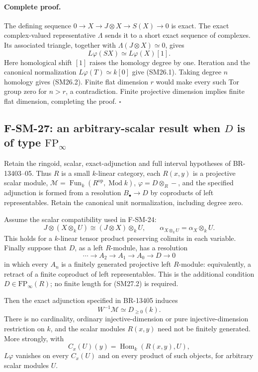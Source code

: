 \documentclass[11pt,a4paper]{article}
\theoremstyle{definition}\newtheorem{definition}[theorem]{Definition}
\theoremstyle{remark}\newtheorem{remark}[theorem]{Remark}
\begin{document}
\paragraph{Complete proof.}
The defining sequence
\(0\to X\to J\otimes X\to S(X)\to0\) is exact.
The exact complex-valued representative \(\Lambda\) sends it to a short
exact sequence of complexes.  Its associated triangle, together with
\(\Lambda(J\otimes X)\simeq0\), gives
\[
 L\varphi(SX)\simeq L\varphi(X)[1].
\]
Here homological shift \([1]\) raises the homology degree by one.
Iteration and the canonical normalization \(L\varphi(T)\simeq k[0]\)
give (SM26.1).  Taking degree \(n\) homology gives (SM26.2).
Finite flat dimension \(r\) would make every such Tor group zero for
\(n>r\), a contradiction.  Finite projective dimension implies finite
flat dimension, completing the proof. \(\square\)

\subsection{F-SM-27: an arbitrary-scalar result when \(D\) is of type \(\mathrm{FP}_\infty\)}
Retain the ringoid, scalar, exact-adjunction and full interval hypotheses
of BR-13403--05.  Thus \(R\) is a small \(k\)-linear category, each
\(R(x,y)\) is a projective scalar module,
\(\mathcal M=\operatorname{Fun}_k(R^{\mathrm{op}},\operatorname{Mod}k)\),
\(\varphi=D\otimes_R-\), and the specified adjunction is formed from
a resolution \(B_\bullet\to D\) by coproducts of left representables.
Retain the canonical unit normalization, including degree zero.

Assume the scalar compatibility used in F-SM-24:
\[
 J\otimes(X\otimes_kU)\cong(J\otimes X)\otimes_kU,\qquad
 \alpha_{X\otimes_kU}=\alpha_X\otimes_kU.
 \tag{SM27.1}
\]
This holds for a \(k\)-linear tensor product preserving colimits in each
variable.  Finally suppose that \(D\), as a left \(R\)-module, has a
resolution
\[
 \cdots\longrightarrow A_2\longrightarrow A_1
 \longrightarrow A_0\longrightarrow D\longrightarrow0
 \tag{SM27.2}
\]
in which every \(A_n\) is a finitely generated projective left
\(R\)-module: equivalently, a retract of a finite coproduct of left
representables.  This is the additional condition
\(D\in\mathrm{FP}_\infty(R)\); no finite length for (SM27.2) is required.

Then the exact adjunction specified in BR-13405 induces
\[
 W^{-1}\mathcal M\simeq D_{\ge0}(k).
 \tag{SM27.3}
\]
There is no cardinality, ordinary injective-dimension or pure
injective-dimension restriction on \(k\), and the scalar modules
\(R(x,y)\) need not be finitely generated.  More strongly, with
\[
 C_x(U)(y)=\operatorname{Hom}_k(R(x,y),U),
 \tag{SM27.4}
\]
\(L\varphi\) vanishes on every \(C_x(U)\) and on every product of such
objects, for arbitrary scalar modules \(U\).
\end{document}
